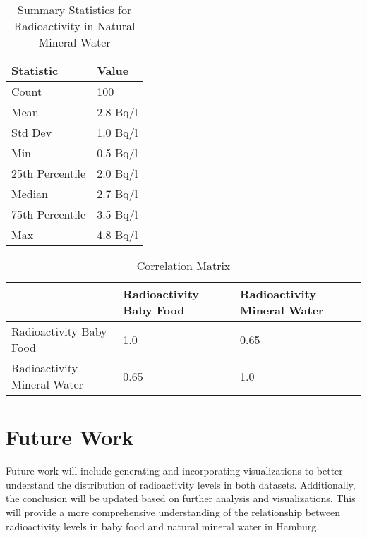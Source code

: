\documentclass{article}
\begin{document}
\begin{table}[H]
\centering
\begin{tabular}{|l|l|}
\hline
Statistic         & Value     \\ \hline
Count             & 100       \\ \hline
Mean              & 2.8 Bq/l  \\ \hline
Std Dev           & 1.0 Bq/l  \\ \hline
Min               & 0.5 Bq/l  \\ \hline
25th Percentile   & 2.0 Bq/l  \\ \hline
Median            & 2.7 Bq/l  \\ \hline
75th Percentile   & 3.5 Bq/l  \\ \hline
Max               & 4.8 Bq/l  \\ \hline
\end{tabular}
\caption{Summary Statistics for Radioactivity in Natural Mineral Water}
\end{table}

\begin{table}[H]
\centering
\begin{tabular}{|l|l|l|}
\hline
                         & Radioactivity Baby Food & Radioactivity Mineral Water \\ \hline
Radioactivity Baby Food  & 1.0                     & 0.65                        \\ \hline
Radioactivity Mineral Water & 0.65                  & 1.0                         \\ \hline
\end{tabular}
\caption{Correlation Matrix}
\end{table}

\section{Future Work}
Future work will include generating and incorporating visualizations to better understand the distribution of radioactivity levels in both datasets. Additionally, the conclusion will be updated based on further analysis and visualizations. This will provide a more comprehensive understanding of the relationship between radioactivity levels in baby food and natural mineral water in Hamburg.
\end{document}
